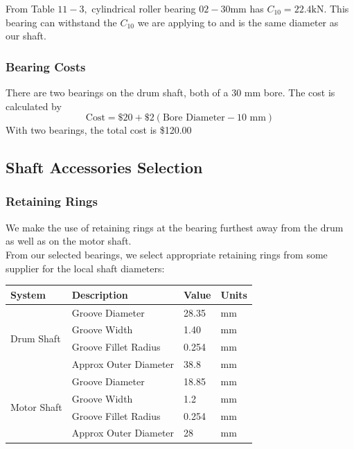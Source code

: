 \documentclass[letterpaper,12pt]{article}
\begin{document}
\noindent From Table $11 - 3 ,$ cylindrical roller bearing $02 - 30 \mathrm { mm }$ has $C _ { 10 } = 22.4 \mathrm { kN }$. This bearing can withstand the $C_{10}$ we are applying to and is the same diameter as our shaft. \\

\subsubsection{Bearing Costs}

There are two bearings on the drum shaft, both of a 30 mm bore. The cost is calculated by
\begin{equation}
    \text{Cost} = \$20 + \$2(\text{Bore Diameter} - 10 \text{ mm})
\end{equation}
With two bearings, the total cost is \$120.00

\subsection{Shaft Accessories Selection}

\subsubsection{Retaining Rings}
We make the use of retaining rings at the bearing furthest away from the drum as well as on the motor shaft.\\

\noindent From our selected bearings, we select appropriate retaining rings from some supplier \cite{rr} for the local shaft diameters:

\begin{center}
	\begin{tabular}{|p{1.5cm} |p{4cm}||p{1.5cm}|p{1.5cm}|  }
		\hline
		System & Description & Value & Units\\
		\hline
		\multirow{4}{4em}{Drum Shaft}
		& Groove Diameter & 28.35 & mm\\
		& Groove Width & 1.40 & mm\\
		& Groove Fillet Radius & 0.254 & mm\\
        & Approx Outer Diameter & 38.8 & mm\\
		\hline
		\hline
		\multirow{4}{4em}{Motor Shaft}
		& Groove Diameter & 18.85 & mm\\
		& Groove Width & 1.2 & mm\\
		& Groove Fillet Radius & 0.254 & mm\\
        & Approx Outer Diameter & 28 & mm\\
		\hline
	\end{tabular}
\end{center}
\end{document}
